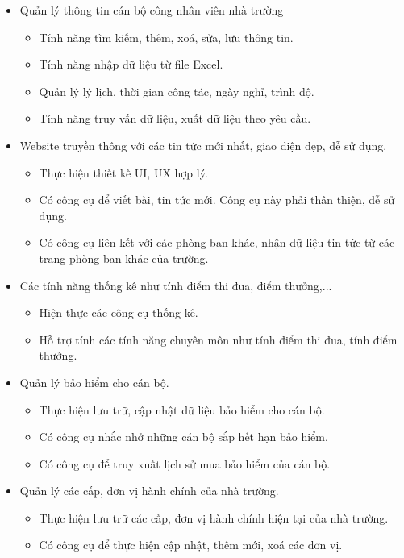 \begin{itemize}
    \item Quản lý thông tin cán bộ công nhân viên nhà trường
    \begin{itemize}
        \item Tính năng tìm kiếm, thêm, xoá, sửa, lưu thông tin.
        \item Tính năng nhập dữ liệu từ file Excel.
        \item Quản lý lý lịch, thời gian công tác, ngày nghỉ, trình độ.
        \item Tính năng truy vấn dữ liệu, xuất dữ liệu theo yêu cầu. 
    \end{itemize}
    \item Website truyền thông với các tin tức mới nhất, giao diện đẹp, dễ sử dụng.
    \begin{itemize}
        \item Thực hiện thiết kế UI, UX hợp lý.
        \item Có công cụ để viết bài, tin tức mới. Công cụ này phải thân thiện, dễ sử dụng.
        \item Có công cụ liên kết với các phòng ban khác, nhận dữ liệu tin tức từ các trang phòng ban khác của trường.
    \end{itemize}
    \item Các tính năng thống kê như tính điểm thi đua, điểm thưởng,...
    \begin{itemize}
        \item Hiện thực các công cụ thống kê.
        \item Hỗ trợ tính các tính năng chuyên môn như tính điểm thi đua, tính điểm thưởng.
    \end{itemize}
    \item Quản lý bảo hiểm cho cán bộ.
    \begin{itemize}
        \item Thực hiện lưu trữ, cập nhật dữ liệu bảo hiểm cho cán bộ.
        \item Có công cụ nhắc nhở những cán bộ sắp hết hạn bảo hiểm.
        \item Có công cụ để truy xuất lịch sử mua bảo hiểm của cán bộ.
    \end{itemize}
    \item Quản lý các cấp, đơn vị hành chính của nhà trường.
    \begin{itemize}
        \item Thực hiện lưu trữ các cấp, đơn vị hành chính hiện tại của nhà trường.
        \item Có công cụ để thực hiện cập nhật, thêm mới, xoá các đơn vị.

\end{itemize}
\end{itemize}
